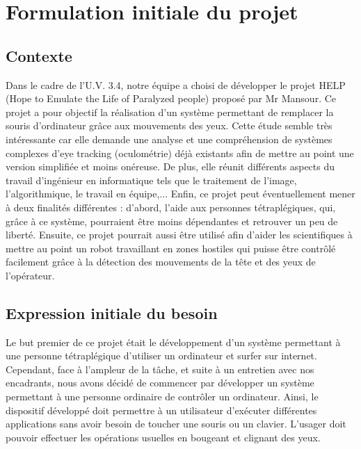 \chapter{Formulation initiale du projet}



\section{Contexte}

Dans le cadre de l'U.V. 3.4, notre équipe a choisi de développer le projet HELP (Hope to Emulate the Life of Paralyzed people) proposé par Mr Mansour. Ce projet a pour objectif la réalisation d'un système permettant de remplacer la souris d’ordinateur grâce aux mouvements des yeux. Cette étude semble très intéressante car elle demande une analyse et une compréhension de systèmes complexes d'eye tracking (oculométrie) déjà existants afin de mettre au point une version simplifiée et moins onéreuse. De plus, elle réunit différents aspects du travail d'ingénieur en informatique tels que le traitement de l'image, l'algorithmique, le travail en équipe,... Enfin, ce projet peut éventuellement mener à deux finalités différentes : d'abord, l'aide aux personnes tétraplégiques, qui, grâce à ce système, pourraient être moins dépendantes et retrouver un peu de liberté. Ensuite, ce projet pourrait aussi être utilisé afin d'aider les scientifiques à mettre au point un robot travaillant en zones hostiles qui puisse être contrôlé facilement grâce à la détection des mouvements de la tête et des yeux de l'opérateur.

\section{Expression initiale du besoin}

Le but premier de ce projet était le développement d'un système permettant à une personne tétraplégique d'utiliser un ordinateur et surfer sur internet. Cependant, face à l'ampleur de la tâche, et suite à un entretien avec nos encadrants, nous avons décidé de commencer par développer un système permettant à une personne ordinaire de contrôler un ordinateur. Ainsi, le dispositif développé doit permettre à un utilisateur d'exécuter différentes applications sans avoir besoin de toucher une souris ou un clavier. L'usager doit pouvoir effectuer les opérations usuelles en bougeant et clignant des yeux.
